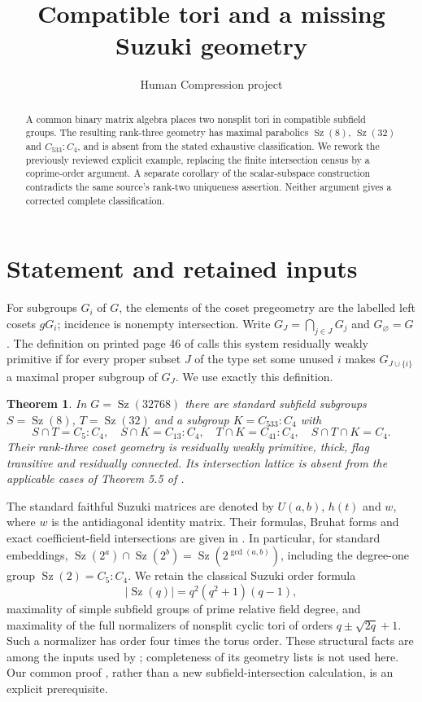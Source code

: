 \documentclass[11pt,a4paper]{article}
\title{Compatible tori and a missing Suzuki geometry}
\author{Human Compression project}\date{}
\newtheorem{theorem}{Theorem}
\newcommand{\Sz}{\operatorname{Sz}}
\begin{document}
\maketitle
\begin{abstract}
A common binary matrix algebra places two nonsplit tori in compatible
subfield groups. The resulting rank-three geometry has maximal
parabolics $\Sz(8)$, $\Sz(32)$ and $C_{533}:C_4$, and is absent from
the stated exhaustive classification. We rework the previously reviewed
explicit example, replacing the finite intersection census by a
coprime-order argument. A separate corollary of the scalar-subspace
construction contradicts the same source's rank-two uniqueness assertion.
Neither argument gives a corrected complete classification.
\end{abstract}

\section{Statement and retained inputs}
For subgroups $G_i$ of $G$, the elements of the coset pregeometry are
the labelled left cosets $gG_i$; incidence is nonempty intersection.
Write $G_J=\bigcap_{j\in J}G_j$ and $G_\varnothing=G$.
The definition on printed page 46 of \cite{source} calls this system
residually weakly primitive if for every proper subset $J$ of the type
set some unused $i$ makes $G_{J\cup\{i\}}$ a maximal proper subgroup
of $G_J$. We use exactly this definition.

\begin{theorem}\label{main}
In $G=\Sz(32768)$ there are standard subfield subgroups
$S=\Sz(8)$, $T=\Sz(32)$ and a subgroup $K=C_{533}:C_4$ with
\[
 S\cap T=C_5:C_4,\quad S\cap K=C_{13}:C_4,\quad
 T\cap K=C_{41}:C_4,\quad S\cap T\cap K=C_4.
                                                        \tag{1}
\]
Their rank-three coset geometry is residually weakly primitive, thick,
flag transitive and residually connected. Its intersection lattice is
absent from the applicable cases of Theorem 5.5 of \cite{source}.
\end{theorem}

The standard faithful Suzuki matrices are denoted by $U(a,b)$,
$h(t)$ and $w$, where $w$ is the antidiagonal identity matrix. Their
formulas, Bruhat forms and exact coefficient-field intersections are
given in \cite[Lemma 1]{subfields}. In particular, for standard
embeddings, $\Sz(2^a)\cap\Sz(2^b)=\Sz(2^{\gcd(a,b)})$,
including the degree-one group $\Sz(2)=C_5:C_4$.
We retain the classical Suzuki order formula
\[
                       |\Sz(q)|=q^2(q^2+1)(q-1),         \tag{2}
\]
maximality of simple subfield groups of prime relative field degree,
and maximality of the full normalizers of nonsplit cyclic tori of
orders $q\pm\sqrt{2q}+1$. Such a normalizer has order four times the
torus order. These structural facts are among the inputs used by
\cite[Section 3]{source}; completeness of its geometry lists is not
used here. Our common proof \cite[Lemma 1]{subfields}, rather than
a new subfield-intersection calculation, is an explicit prerequisite.
\end{document}
